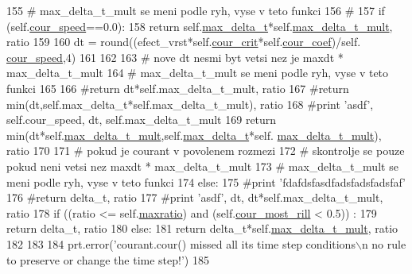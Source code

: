 \begin{DoxyCode}
155       \textcolor{comment}{# max\_delta\_t\_mult se meni podle ryh, vyse v teto funkci}
156       \textcolor{comment}{#}
157       \textcolor{keywordflow}{if} (self.\hyperlink{classsmoderp2d_1_1src_1_1courant_1_1Courant_a2e4c6d74b15eb45d67ebba896b97eb32}{cour\_speed}==0.0):
158         \textcolor{keywordflow}{return} self.\hyperlink{classsmoderp2d_1_1src_1_1courant_1_1Courant_a03e5161b202d6d9ecaa2ab6bc2f6364c}{max\_delta\_t}*self.\hyperlink{classsmoderp2d_1_1src_1_1courant_1_1Courant_a4cd64dfec3bd294d881fd28581250b45}{max\_delta\_t\_mult}, ratio
159 
160       dt = round((efect\_vrst*self.\hyperlink{classsmoderp2d_1_1src_1_1courant_1_1Courant_a059271cdbd6044635ad290eadff9299b}{cour\_crit}*self.\hyperlink{classsmoderp2d_1_1src_1_1courant_1_1Courant_ae0eb94299899733aa39b68e166115809}{cour\_coef})/self.
      \hyperlink{classsmoderp2d_1_1src_1_1courant_1_1Courant_a2e4c6d74b15eb45d67ebba896b97eb32}{cour\_speed},4)
161 
162 
163       \textcolor{comment}{# nove dt nesmi byt vetsi nez je maxdt * max\_delta\_t\_mult}
164       \textcolor{comment}{# max\_delta\_t\_mult se meni podle ryh, vyse v teto funkci}
165       
166       \textcolor{comment}{#return dt*self.max\_delta\_t\_mult, ratio}
167       \textcolor{comment}{#return min(dt,self.max\_delta\_t*self.max\_delta\_t\_mult), ratio}
168       \textcolor{comment}{#print 'asdf', self.cour\_speed, dt, self.max\_delta\_t\_mult}
169       \textcolor{keywordflow}{return} min(dt*self.\hyperlink{classsmoderp2d_1_1src_1_1courant_1_1Courant_a4cd64dfec3bd294d881fd28581250b45}{max\_delta\_t\_mult},self.\hyperlink{classsmoderp2d_1_1src_1_1courant_1_1Courant_a03e5161b202d6d9ecaa2ab6bc2f6364c}{max\_delta\_t}*self.
      \hyperlink{classsmoderp2d_1_1src_1_1courant_1_1Courant_a4cd64dfec3bd294d881fd28581250b45}{max\_delta\_t\_mult}), ratio
170 
171     \textcolor{comment}{# pokud je courant v povolenem rozmezi}
172     \textcolor{comment}{# skontrolje se pouze pokud neni vetsi nez maxdt * max\_delta\_t\_mult}
173     \textcolor{comment}{# max\_delta\_t\_mult se meni podle ryh, vyse v teto funkci}
174     \textcolor{keywordflow}{else}:
175       \textcolor{comment}{#print 'fdafdsfasdfadsfadsfadsfaf'}
176       \textcolor{comment}{#return delta\_t, ratio}
177       \textcolor{comment}{#print 'asdf', dt, dt*self.max\_delta\_t\_mult, ratio}
178       \textcolor{keywordflow}{if} ((ratio <= self.\hyperlink{classsmoderp2d_1_1src_1_1courant_1_1Courant_aca2e98eb52dc3dcd664209462b181ba1}{maxratio}) \textcolor{keywordflow}{and} (self.\hyperlink{classsmoderp2d_1_1src_1_1courant_1_1Courant_a2bfcce1ddcb5060045dbd777c848c9f2}{cour\_most\_rill} < 0.5)) :
179         \textcolor{keywordflow}{return} delta\_t, ratio
180       \textcolor{keywordflow}{else}:
181         \textcolor{keywordflow}{return} delta\_t*self.\hyperlink{classsmoderp2d_1_1src_1_1courant_1_1Courant_a4cd64dfec3bd294d881fd28581250b45}{max\_delta\_t\_mult}, ratio
182 
183 
184     prt.error(\textcolor{stringliteral}{'courant.cour() missed all its time step conditions\(\backslash\)n no rule to preserve or change the time
       step!'})
185 
\end{DoxyCode}
